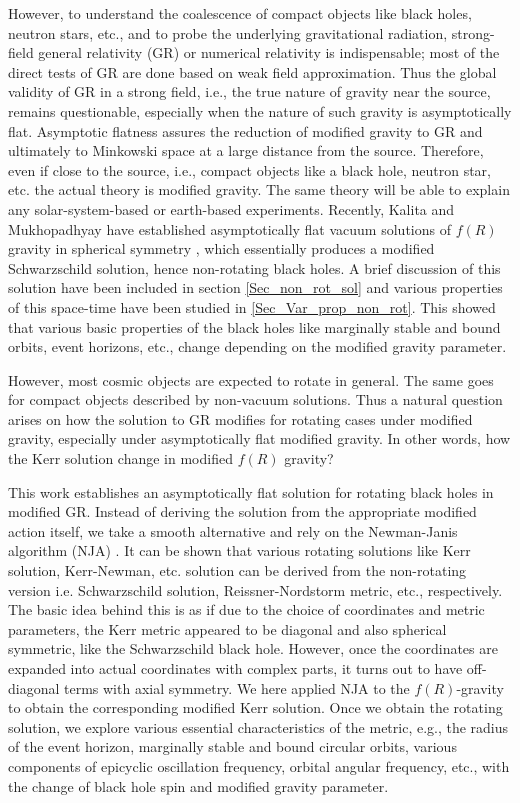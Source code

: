 \documentclass[12pt,a4paper,oneside]{book}
\begin{document}
However, to understand the coalescence of compact objects like black holes, neutron stars, etc., and to probe the underlying gravitational radiation, strong-field general relativity (GR) or numerical relativity is indispensable; most of the direct tests of GR are done based on weak field approximation. Thus the global validity of GR in a strong field, i.e., the true nature of gravity near the source, remains questionable, especially when the nature of such gravity is asymptotically flat. Asymptotic flatness assures the reduction of modified gravity to GR and ultimately to Minkowski space at a large distance from the source. Therefore, even if close to the source, i.e., compact objects like a black hole, neutron star, etc. the actual theory is modified gravity. The same theory will be able to explain any solar-system-based or earth-based experiments. Recently, Kalita and Mukhopadhyay have established asymptotically flat vacuum solutions of $f(R)$ gravity in spherical symmetry \cite{Kalita_Bani}, which essentially produces a modified Schwarzschild solution, hence non-rotating black holes. A brief discussion of this solution have been included in section \ref{Sec_non_rot_sol} and various properties of this space-time have been studied in \ref{Sec_Var_prop_non_rot}. This showed that various basic properties of the black holes like marginally stable and bound orbits, event horizons, etc., change depending on the modified gravity parameter. 

However, most cosmic objects are expected to rotate in general. The same goes for compact objects described by non-vacuum solutions. Thus a natural question arises on how the solution to GR modifies for rotating cases under modified gravity, especially under asymptotically flat modified gravity. In other words, how the Kerr solution change in modified $f(R)$ gravity?

This work establishes an asymptotically flat solution for rotating black holes in modified GR. Instead of deriving the solution from the appropriate modified action itself, we take a smooth alternative and rely on the Newman-Janis algorithm (NJA) \cite{NJA_Orig}. It can be shown \cite{NJA_1, NJA_Revisited} that various rotating solutions like Kerr solution, Kerr-Newman, etc. solution can be derived from the non-rotating version i.e. Schwarzschild solution, Reissner-Nordstorm metric, etc., respectively. The basic idea behind this is as if due to the choice of coordinates and metric parameters, the Kerr metric appeared to be diagonal and also spherical symmetric, like the Schwarzschild black hole. However, once the coordinates are expanded into actual coordinates with complex parts, it turns out to have off-diagonal terms with axial symmetry. We here applied NJA to the $f(R)$-gravity \cite{Kalita_Bani} to obtain the corresponding modified Kerr solution. Once we obtain the rotating solution, we explore various essential characteristics of the metric, e.g., the radius of the event horizon, marginally stable and bound circular orbits, various components of epicyclic oscillation frequency, orbital angular frequency, etc., with the change of black hole spin and modified gravity parameter.
\end{document}
